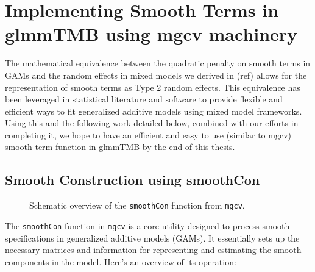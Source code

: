 \documentclass[12pt, twoside,hidelinks]{article}
\theoremstyle{definition}
\numberwithin{equation}{section}
\begin{document}
\section{Implementing Smooth Terms in glmmTMB using mgcv machinery}

The mathematical equivalence between the quadratic penalty on smooth terms in GAMs and the random effects in mixed models we derived in (ref) allows for the representation of smooth terms as Type 2 random effects. This equivalence has been leveraged in statistical literature and software to provide flexible and efficient ways to fit generalized additive models using mixed model frameworks. Using this and the following work detailed below, combined with our efforts in completing it, we hope to have an efficient and easy to use (similar to mgcv) smooth term function in glmmTMB by the end of this thesis. 

\subsection{Smooth Construction using smoothCon}

\begin{figure}[H]
\centering
{}
\caption{Schematic overview of the \texttt{smoothCon} function from \texttt{mgcv}.}
\end{figure}


The \texttt{smoothCon} function in \texttt{mgcv} is a core utility designed to process smooth specifications in generalized additive models (GAMs). It essentially sets up the necessary matrices and information for representing and estimating the smooth components in the model. Here's an overview of its operation:
\end{document}
